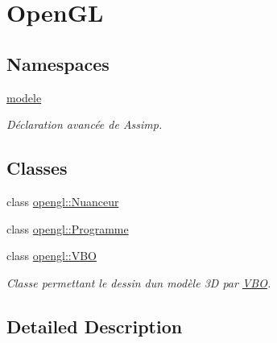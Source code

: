 \hypertarget{group__opengl}{}\section{Open\+G\+L}
\label{group__opengl}
\subsection*{Namespaces}
\begin{DoxyCompactItemize}
\item 
 \hyperlink{namespacemodele}{modele}
\begin{DoxyCompactList}\small\item\em Déclaration avancée de Assimp. \end{DoxyCompactList}\end{DoxyCompactItemize}
\subsection*{Classes}
\begin{DoxyCompactItemize}
\item 
class \hyperlink{classopengl_1_1_nuanceur}{opengl\+::\+Nuanceur}
\item 
class \hyperlink{classopengl_1_1_programme}{opengl\+::\+Programme}
\item 
class \hyperlink{classopengl_1_1_v_b_o}{opengl\+::\+V\+B\+O}
\begin{DoxyCompactList}\small\item\em Classe permettant le dessin d\textquotesingle{}un modèle 3\+D par \hyperlink{classopengl_1_1_v_b_o}{V\+B\+O}. \end{DoxyCompactList}\end{DoxyCompactItemize}


\subsection{Detailed Description}

